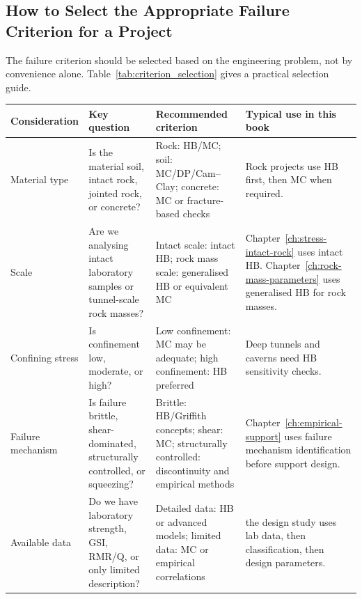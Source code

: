 \subsection{How to Select the Appropriate Failure Criterion for a Project}

The failure criterion should be selected based on the engineering problem, not by
convenience alone. Table~\ref{tab:criterion_selection} gives a practical selection guide.

\begin{table}[H]
\centering
\footnotesize
\begin{tabularx}{\textwidth}{l Y Y Y}
\toprule
\textbf{Consideration} & \textbf{Key question} & \textbf{Recommended criterion} & \textbf{Typical use in this book} \\
\midrule
Material type
& Is the material soil, intact rock, jointed rock, or concrete?
& Rock: HB/MC; soil: MC/DP/Cam--Clay; concrete: MC or fracture-based checks
& Rock projects use HB first, then MC when required. \\

Scale
& Are we analysing intact laboratory samples or tunnel-scale rock masses?
& Intact scale: intact HB; rock mass scale: generalised HB or equivalent MC
& Chapter~\ref{ch:stress-intact-rock} uses intact HB. Chapter~\ref{ch:rock-mass-parameters} uses generalised HB for rock masses. \\

Confining stress
& Is confinement low, moderate, or high?
& Low confinement: MC may be adequate; high confinement: HB preferred
& Deep tunnels and caverns need HB sensitivity checks. \\

Failure mechanism
& Is failure brittle, shear-dominated, structurally controlled, or squeezing?
& Brittle: HB/Griffith concepts; shear: MC; structurally controlled: discontinuity and empirical methods
& Chapter~\ref{ch:empirical-support} uses failure mechanism identification before support design. \\

Available data
& Do we have laboratory strength, GSI, RMR/Q, or only limited description?
& Detailed data: HB or advanced models; limited data: MC or empirical correlations
& the design study uses lab data, then classification, then design parameters. \\


\end{tabularx}
\end{table}
